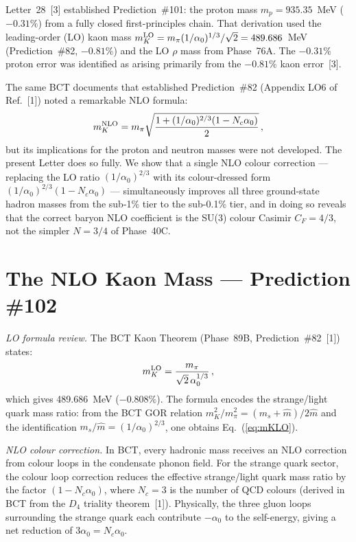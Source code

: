 \documentclass[10pt,twocolumn]{article}
\begin{document}
Letter~28~[3] established Prediction~\#101: the proton mass $m_p = 935.35$~MeV ($-0.31\%$) from
a fully closed first-principles chain. That derivation used the leading-order (LO) kaon mass
$m_K^{\rm LO} = m_\pi(1/\alpha_0)^{1/3}/\sqrt{2} = 489.686$~MeV (Prediction~\#82, $-0.81\%$)
and the LO $\rho$ mass from Phase~76A. The $-0.31\%$ proton error was identified as arising
primarily from the $-0.81\%$ kaon error~[3].

The same BCT documents that established Prediction~\#82 (Appendix LO6 of Ref.~[1]) noted a
remarkable NLO formula:
\begin{equation}
m_K^{\rm NLO} = m_\pi\sqrt{\frac{1+(1/\alpha_0)^{2/3}(1-N_c\alpha_0)}{2}}\,,
\label{eq:mKNLO}
\end{equation}
but its implications for the proton and neutron masses were not developed. The present Letter
does so fully. We show that a single NLO colour correction --- replacing the LO ratio
$(1/\alpha_0)^{2/3}$ with its colour-dressed form $(1/\alpha_0)^{2/3}(1-N_c\alpha_0)$ ---
simultaneously improves all three ground-state hadron masses from the sub-1\% tier to the
sub-0.1\% tier, and in doing so reveals that the correct baryon NLO coefficient is the SU(3)
colour Casimir $C_F = 4/3$, not the simpler $N = 3/4$ of Phase~40C.

\section{The NLO Kaon Mass --- Prediction \#102}

\textit{LO formula review.} The BCT Kaon Theorem (Phase~89B, Prediction~\#82~[1]) states:
\begin{equation}
m_K^{\rm LO} = \frac{m_\pi}{\sqrt{2}\,\alpha_0^{1/3}}\,,
\label{eq:mKLO}
\end{equation}
which gives 489.686~MeV ($-0.808\%$). The formula encodes the strange/light quark mass ratio:
from the BCT GOR relation $m_K^2/m_\pi^2 = (m_s + \hat{m})/2\hat{m}$ and the identification
$m_s/\hat{m} = (1/\alpha_0)^{2/3}$, one obtains Eq.~(\ref{eq:mKLO}).

\textit{NLO colour correction.} In BCT, every hadronic mass receives an NLO correction from
colour loops in the condensate phonon field. For the strange quark sector, the colour loop
correction reduces the effective strange/light quark mass ratio by the factor $(1-N_c\alpha_0)$,
where $N_c = 3$ is the number of QCD colours (derived in BCT from the $D_4$ triality
theorem~[1]). Physically, the three gluon loops surrounding the strange quark each contribute
$-\alpha_0$ to the self-energy, giving a net reduction of $3\alpha_0 = N_c\alpha_0$.
\end{document}

